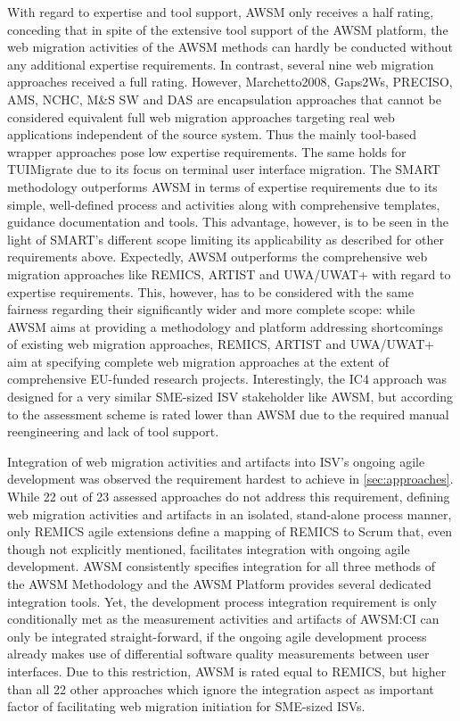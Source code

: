 With regard to expertise and tool support, AWSM only receives a half rating, conceding that in spite of the extensive tool support of the AWSM platform, the web migration activities of the AWSM methods can hardly be conducted without any additional expertise requirements.
In contrast, several nine web migration approaches received a full rating.
However, Marchetto2008, Gaps2Ws, PRECISO, AMS, NCHC, M\&S SW and DAS are encapsulation approaches that cannot be considered equivalent full web migration approaches targeting real web applications independent of the source system.
Thus the mainly tool-based wrapper approaches pose low expertise requirements.
The same holds for TUIMigrate due to its focus on terminal user interface migration.
The SMART methodology outperforms AWSM in terms of expertise requirements due to its simple, well-defined process and activities along with comprehensive templates, guidance documentation and tools.
This advantage, however, is to be seen in the light of SMART's different scope limiting its applicability as described for other requirements above.
Expectedly, AWSM outperforms the comprehensive web migration approaches like REMICS, ARTIST and UWA/UWAT+ with regard to expertise requirements.
This, however, has to be considered with the same fairness regarding their significantly wider and more complete scope: while AWSM aims at providing a methodology and platform addressing shortcomings of existing web migration approaches, REMICS, ARTIST and UWA/UWAT+ aim at specifying complete web migration approaches at the extent of comprehensive EU-funded research projects.
Interestingly, the IC4 approach was designed for a very similar SME-sized ISV stakeholder like AWSM, but according to the assessment scheme is rated lower than AWSM due to the required manual reengineering and lack of tool support.

Integration of web migration activities and artifacts into ISV's ongoing agile development was observed the requirement hardest to achieve in \cref{sec:approaches}.
While 22 out of 23 assessed approaches do not address this requirement, defining web migration activities and artifacts in an isolated, stand-alone process manner, only REMICS agile extensions define a mapping of REMICS to Scrum that, even though not explicitly mentioned, facilitates integration with ongoing agile development.
AWSM consistently specifies integration for all three methods of the AWSM Methodology and the AWSM Platform provides several dedicated integration tools.
Yet, the development process integration requirement is only conditionally met as the measurement activities and artifacts of AWSM:CI can only be integrated straight-forward, if the ongoing agile development process already makes use of differential software quality measurements between user interfaces.
Due to this restriction, AWSM is rated equal to REMICS, but higher than all 22 other approaches which ignore the integration aspect as important factor of facilitating web migration initiation for SME-sized ISVs.

